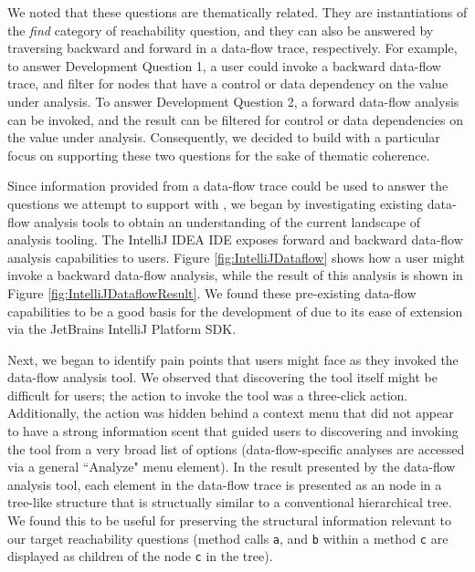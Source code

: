 \par We noted that these questions are thematically related. They are instantiations 
of the \textit{find} category of reachability question, and they can also be
answered by traversing backward and forward in a data-flow trace, respectively.
For example, to answer Development Question 1, a user could invoke a backward
data-flow trace, and filter for nodes that have a control or data dependency
on the value under analysis.
To answer Development Question 2, a forward data-flow analysis can be invoked,
and the result can be filtered for control or data dependencies on the value
under analysis.
Consequently, we decided to build \toolname{} with a particular focus on
supporting these two questions for the sake of thematic coherence.

\par Since information provided from a data-flow trace could be used to answer
the questions we attempt to support with \toolname{}, we began by investigating 
existing data-flow analysis tools to obtain an understanding of the current 
landscape of analysis tooling.
The IntelliJ IDEA \ac{IDE} exposes forward and backward data-flow analysis
capabilities to users.
Figure \ref{fig:IntelliJDataflow} shows how a user might invoke a backward 
data-flow analysis, while the result of this analysis is shown in
Figure \ref{fig:IntelliJDataflowResult}.
We found these pre-existing data-flow capabilities to be a good basis for the 
development of \toolname{} due to its ease of extension via the JetBrains 
IntelliJ Platform \ac{SDK}.

\par Next, we began to identify pain points that users might face as they
invoked the data-flow analysis tool.
We observed that discovering the tool itself might be difficult for
users; the action to invoke the tool was a three-click action.
Additionally, the action was hidden behind a context menu that did not appear
to have a strong information scent that guided users to discovering and invoking
the tool from a very broad list of options (\ie data-flow-specific analyses
are accessed via a general ``Analyze" menu element).
In the result presented by the data-flow analysis tool, each element in the 
data-flow trace is presented as an node in a tree-like structure that is 
structually similar to a conventional hierarchical tree.
We found this to be useful for preserving the structural information relevant
to our target reachability questions (\eg method calls \texttt{a}, and \texttt{b}
within a method \texttt{c} are displayed as children of the node \texttt{c} in
the tree).

